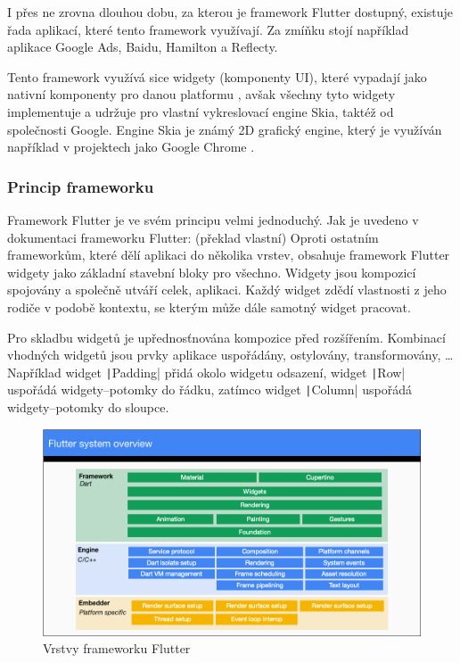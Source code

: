 I přes ne zrovna dlouhou dobu,
za kterou je framework Flutter dostupný,
existuje řada aplikací,
které tento framework využívají.
Za zmíňku stojí například aplikace Google Ads, Baidu, Hamilton a Reflecty.
\cite{flutter}

Tento framework využívá sice widgety (komponenty UI),
které vypadají jako nativní komponenty pro danou platformu \cite{flutter},
avšak všechny tyto widgety implementuje a udržuje pro vlastní vykreslovací
engine Skia,
taktéž od společnosti Google.
Engine Skia je známý 2D grafický engine,
který je využíván například v projektech jako Google Chrome \cite{skia}.

\subsubsection*{Princip frameworku }

Framework Flutter je ve svém principu velmi jednoduchý.
Jak je uvedeno v dokumentaci frameworku Flutter:
\emph{} \cite{flutter_technical_overview} (překlad vlastní)
Oproti ostatním frameworkům,
které dělí aplikaci do několika vrstev,
obsahuje framework Flutter widgety jako základní stavební bloky pro všechno.
Widgety jsou kompozicí spojovány a společně utváří celek, aplikaci.
Každý widget zdědí vlastnosti z jeho rodiče v podobě kontextu,
se kterým může dále samotný widget pracovat.
\cite{flutter_technical_overview}

Pro skladbu widgetů je upřednosťnována kompozice před rozšířením.
Kombinací vhodných widgetů jsou prvky aplikace uspořádány, ostylovány,
transformovány, \dots{}
Například widget \texttt|Padding| přidá okolo widgetu odsazení,
widget \texttt|Row| uspořádá widgety--potomky do řádku,
zatímco widget \texttt|Column| uspořádá widgety--potomky do sloupce.
\cite{flutter_technical_overview}

\begin{figure}[ht!]
    \centering
    \includegraphics[width=\linewidth]{assets/technology-research/framework/flutter_overview.png}
    \caption{Vrstvy frameworku Flutter  \cite{flutter_technical_overview}}
    \label{fig:flutter_layers}
\end{figure}

